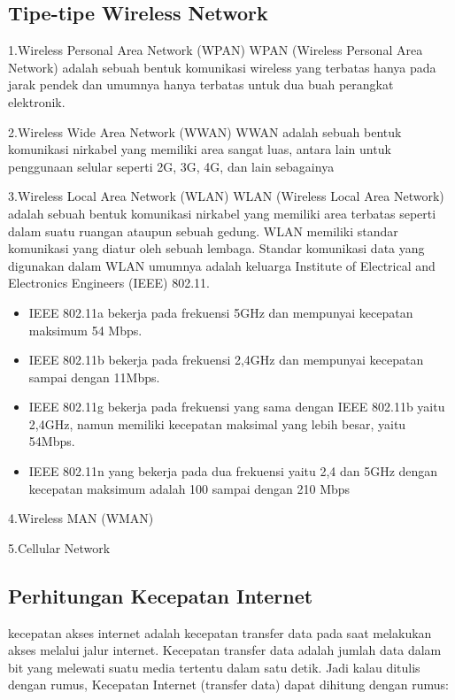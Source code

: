 \documentclass[conference]{IEEEtran}
\begin{document}
\subsection{Tipe-tipe Wireless Network}
1.Wireless Personal Area Network (WPAN)
WPAN (Wireless Personal Area Network) adalah sebuah bentuk komunikasi wireless yang terbatas hanya pada jarak pendek dan umumnya hanya terbatas untuk dua buah perangkat elektronik.
\vspace{5pt}

2.Wireless Wide Area Network (WWAN)
WWAN adalah sebuah bentuk komunikasi nirkabel yang memiliki area sangat luas, antara lain untuk penggunaan selular seperti 2G, 3G, 4G, dan lain sebagainya
\vspace{5pt}

3.Wireless Local Area Network (WLAN)
WLAN (Wireless Local Area Network) adalah sebuah bentuk komunikasi nirkabel yang memiliki area terbatas seperti dalam suatu ruangan ataupun sebuah gedung. WLAN memiliki standar komunikasi yang diatur oleh sebuah lembaga. Standar komunikasi data yang digunakan dalam WLAN umumnya adalah keluarga Institute of Electrical and Electronics Engineers (IEEE) 802.11.
\begin{itemize}
    \item  IEEE 802.11a bekerja pada frekuensi 5GHz dan mempunyai kecepatan maksimum 54 Mbps.
    \item IEEE 802.11b bekerja pada frekuensi 2,4GHz dan mempunyai kecepatan sampai dengan 11Mbps.
    \item IEEE 802.11g bekerja pada frekuensi yang sama dengan IEEE 802.11b yaitu 2,4GHz, namun memiliki kecepatan maksimal yang lebih besar, yaitu 54Mbps.
    \item   IEEE 802.11n yang bekerja pada dua frekuensi yaitu 2,4 dan 5GHz dengan kecepatan maksimum adalah 100 sampai dengan 210 Mbps
\end{itemize}
\vspace{5pt}

4.Wireless MAN (WMAN)
\vspace{5pt}

5.Cellular Network
\subsection{Perhitungan Kecepatan Internet}
kecepatan akses internet adalah kecepatan transfer data pada saat melakukan akses melalui jalur internet. Kecepatan transfer data adalah jumlah data dalam bit yang melewati suatu media tertentu dalam satu detik.
Jadi kalau ditulis dengan rumus, Kecepatan Internet (transfer data) dapat dihitung dengan rumus:
\vspace{2pt}
\end{document}
